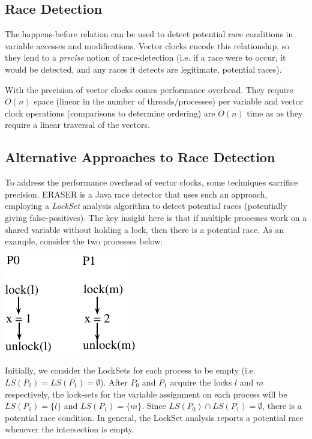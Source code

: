 \documentclass[twoside]{article}
\begin{document}
\subsection{Race Detection}
The happens-before relation can be used to detect potential race conditions in
variable accesses and modifications. Vector clocks encode this relationship, so
they lend to a \emph{precise} notion of race-detection (i.e. if a race were to
occur, it would be detected, and any races it detects are legitimate, potential
races).

With the precision of vector clocks comes performance overhead. They require
$O(n)$ space (linear in the number of threads/processes) per variable and vector
clock operations (comparisons to determine ordering) are $O(n)$ time as as they
require a linear traversal of the vectors.

\subsection{Alternative Approaches to Race Detection}
To address the performance overhead of vector clocks, some techniques sacrifice
precision. ERASER is a Java race detector that uses such an approach, employing
a \emph{LockSet} analysis algorithm to detect potential races (potentially
giving false-positives). The key insight here is that if multiple processes work
on a shared variable without holding a lock, then there is a potential race. As
an example, consider the two processes below:

\begin{center}
    \includegraphics[scale=.75]{example2.pdf}
\end{center}

Initially, we consider the LockSets for each process to be empty (i.e. $LS(P_0)
= LS(P_1) = \emptyset$). After $P_0$ and $P_1$ acquire the locks $l$ and $m$
respectively, the lock-sets for the variable assignment on each process will be
$LS(P_0) = \{l\}$ and $LS(P_1) = \{m\}$. Since $LS(P_0)\cap LS(P_1) =
\emptyset$, there is a potential race condition. In general, the LockSet
analysis reports a potential race whenever the intersection is empty.
\end{document}
